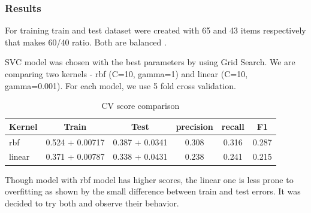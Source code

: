 \documentclass[11pt]{article}
\begin{document}
\subsubsection{Results}

For training train and test dataset were created with 65 and 43 items respectively that makes 60/40 ratio. Both are balanced . 

SVC model was chosen with the best parameters by using Grid Search. We are comparing two kernels - rbf (C=10, gamma=1) and linear (C=10, gamma=0.001). For each model, we use 5 fold cross validation.

\begin{table}[htb]
\begin{center}
\begin{tabular}{ |p{2cm}|c|c|c|c|c| }
\hline
Kernel 	& Train & Test & precision & recall & F1 \\ \hline
rbf		& 0.524 + 0.00717 & 0.387 + 0.0341 & 0.308 & 0.316 & 0.287 \\ \hline
linear	& 0.371 + 0.00787 & 0.338 + 0.0431 & 0.238 & 0.241 & 0.215 \\ \hline
\end{tabular}
\caption{CV score comparison}
\end{center}
\end{table}
\FloatBarrier

Though model with rbf model has higher scores, the linear one is less prone to overfitting as shown by the small difference between train and test errors. It was decided to try both and observe their behavior.
\end{document}
